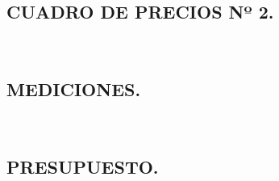 \documentclass[12pt]{article}
\begin{document}
        \subsection{CUADRO DE PRECIOS Nº 2.}
        ~
        \subsection{MEDICIONES.}
        ~
        \subsection{PRESUPUESTO.}
        ~

    \label{Planos}
  
        
        
        
   

    



        
\end{document}
